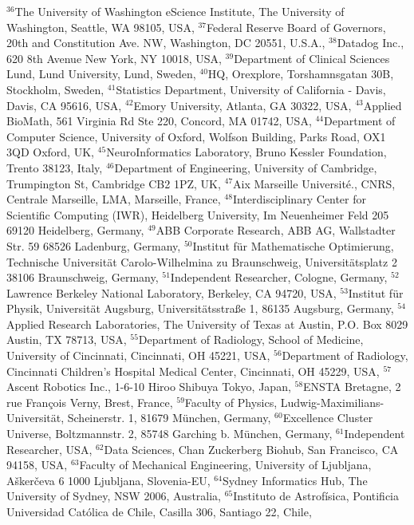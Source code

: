 $^{36}$The University of Washington eScience Institute, The University of Washington, Seattle, WA 98105, USA, 
$^{37}$Federal Reserve Board of Governors,  20th and Constitution Ave. NW, Washington, DC 20551, U.S.A., 
$^{38}$Datadog Inc., 620 8th Avenue New York, NY 10018, USA, 
$^{39}$Department of Clinical Sciences Lund, Lund University, Lund, Sweden, 
$^{40}$HQ, Orexplore, Torshamnsgatan 30B, Stockholm, Sweden, 
$^{41}$Statistics Department, University of California - Davis, Davis, CA 95616, USA, 
$^{42}$Emory University, Atlanta, GA 30322, USA, 
$^{43}$Applied BioMath, 561 Virginia Rd Ste 220, Concord, MA 01742, USA, 
$^{44}$Department of Computer Science, University of Oxford, Wolfson Building, Parks Road, OX1 3QD Oxford, UK, 
$^{45}$NeuroInformatics Laboratory, Bruno Kessler Foundation, Trento 38123, Italy, 
$^{46}$Department of Engineering, University of Cambridge, Trumpington St, Cambridge CB2 1PZ, UK, 
$^{47}$Aix Marseille Universit\'e., CNRS, Centrale Marseille, LMA, Marseille, France, 
$^{48}$Interdisciplinary Center for Scientific Computing (IWR), Heidelberg University, Im Neuenheimer Feld 205 69120 Heidelberg, Germany, 
$^{49}$ABB Corporate Research, ABB AG, Wallstadter Str. 59 68526 Ladenburg, Germany, 
$^{50}$Institut f\"ur Mathematische Optimierung, Technische Universit\"at Carolo-Wilhelmina zu Braunschweig, Universit\"atsplatz 2 38106 Braunschweig, Germany, 
$^{51}$Independent Researcher, Cologne, Germany, 
$^{52}$Lawrence Berkeley National Laboratory, Berkeley, CA 94720, USA, 
$^{53}$Institut f{\"u}r Physik, Universit{\"a}t Augsburg, Universit{\"a}tsstra{\ss}e 1, 86135 Augsburg, Germany, 
$^{54}$Applied Research Laboratories, The University of Texas at Austin, P.O. Box 8029 Austin, TX 78713, USA, 
$^{55}$Department of Radiology, School of Medicine, University of Cincinnati, Cincinnati, OH 45221, USA, 
$^{56}$Department of Radiology, Cincinnati Children's Hospital Medical Center, Cincinnati, OH 45229, USA, 
$^{57}$Ascent Robotics Inc., 1-6-10 Hiroo Shibuya Tokyo, Japan, 
$^{58}$ENSTA Bretagne, 2 rue François Verny, Brest, France, 
$^{59}$Faculty of Physics, Ludwig-Maximilians-Universit\"at, Scheinerstr. 1, 81679 M\"unchen, Germany, 
$^{60}$Excellence Cluster Universe, Boltzmannstr. 2, 85748 Garching b. M\"unchen, Germany, 
$^{61}$Independent Researcher, USA, 
$^{62}$Data Sciences, Chan Zuckerberg Biohub, San Francisco, CA 94158, USA, 
$^{63}$Faculty of Mechanical Engineering, University of Ljubljana, A\v{s}ker\v{c}eva 6 1000 Ljubljana, Slovenia-EU, 
$^{64}$Sydney Informatics Hub, The University of Sydney, NSW 2006, Australia, 
$^{65}$Instituto de Astrof\'{i}sica, Pontificia Universidad Cat\'{o}lica de Chile, Casilla 306, Santiago 22, Chile, 
